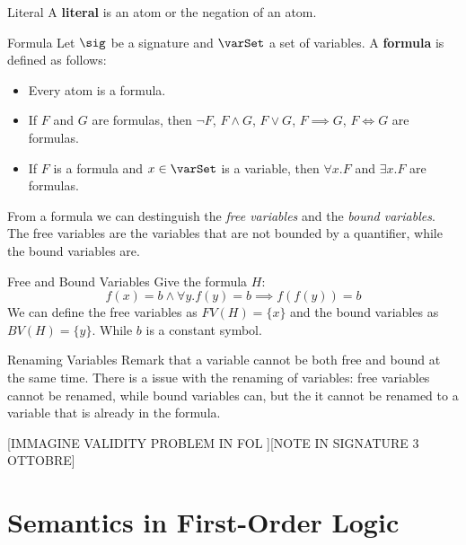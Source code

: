 \begin{definition}{Literal}
    A \textbf{literal} is an atom or the negation of an atom.
\end{definition}

\begin{definition}{Formula}
    Let $\sig$ be a signature and $\varSet$ a set of variables.
    A \textbf{formula} is defined as follows:
    \begin{itemize}
        \item Every atom is a formula.
        \item If $F$ and $G$ are formulas, then 
        $\neg F$, $F \land G$, $F \lor G$, $F \implies G$, $F \iff G$ are formulas.
        \item If $F$ is a formula and $x \in \varSet$ is a variable, 
        then $\forall x.F$ and $\exists x.F$ are formulas.
    \end{itemize}
\end{definition}

From a formula we can destinguish the \textit{free variables} and the \textit{bound variables}.
The free variables are the variables that are not bounded by a quantifier,
while the bound variables are.

\begin{example}{Free and Bound Variables}
    Give the formula $H$:
    \begin{equation*}
        f(x) = b \land \forall y. f(y) = b
        \implies f(f(y)) = b
    \end{equation*}
    We can define the free variables as $FV(H) = \{x\}$ and the bound variables as 
    $BV(H) = \{y\}$. While $b$ is a constant symbol.
\end{example}

\begin{remark}{Renaming Variables}
    Remark that a variable cannot be both free and bound at the same time.
    There is a issue with the renaming of variables:
    free variables cannot be renamed, while bound variables can, 
    but the it cannot be renamed to a variable that is already in the formula.
\end{remark}

[IMMAGINE VALIDITY PROBLEM IN FOL ][NOTE IN SIGNATURE 3 OTTOBRE]

\section{Semantics in First-Order Logic}
\label{sec:Semantics in First-Order Logic}

